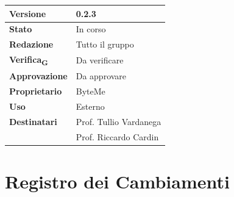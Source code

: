 \documentclass[11pt,a4paper]{article}
\newcommand{\gls}[1]{#1\textsubscript{G}}
\begin{document}
\begin{titlepage}
    \begin{table}[H]
        \centering
        \begin{tabular}{|l|p{5cm}|}
            \hline
            \textbf{Versione} & 0.2.3 \\
            \hline
            \textbf{Stato} & In corso \\
            \hline
            \textbf{Redazione} & Tutto il gruppo\\
            \hline
            \textbf{\gls{Verifica}} & Da verificare\\
            \hline
            \textbf{Approvazione} & Da approvare\\
            \hline
            \textbf{Proprietario} & ByteMe \\
            \hline
            \textbf{Uso} & Esterno \\
            \hline
            \textbf{Destinatari} & Prof. Tullio Vardanega \\ & Prof. Riccardo Cardin \\
            \hline
        \end{tabular}
    \end{table}
    
    \vfill
\end{titlepage}

\thispagestyle{empty}
\section*{Registro dei Cambiamenti}
\end{document}
